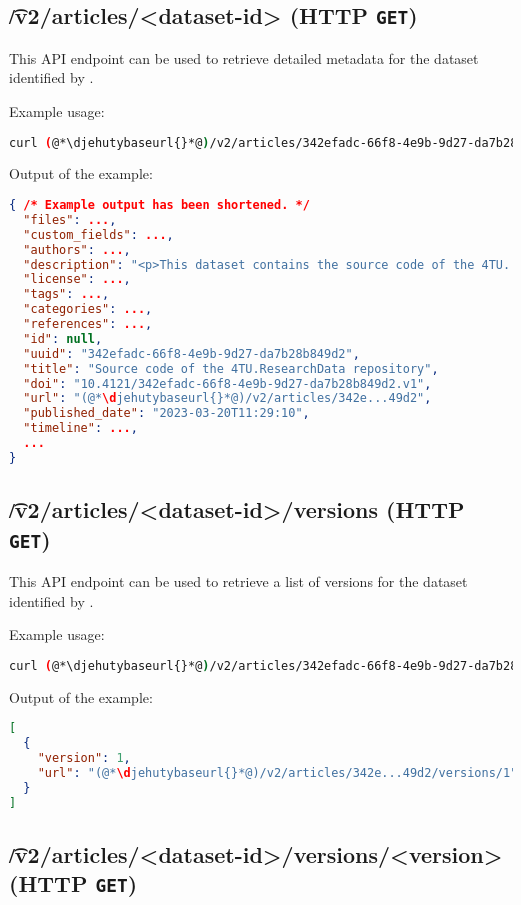 \subsection{\t{/v2/articles/<dataset-id>} (HTTP \texttt{GET})}
\label{sec:v2-articles-dataset-id}

  This API endpoint can be used to retrieve detailed metadata for the dataset
  identified by .

  Example usage:
\begin{lstlisting}[language=bash]
curl (@*\djehutybaseurl{}*@)/v2/articles/342efadc-66f8-4e9b-9d27-da7b28b849d2 | jq
\end{lstlisting}

  Output of the example:
\begin{lstlisting}[language=JSON]
{ /* Example output has been shortened. */
  "files": ...,
  "custom_fields": ...,
  "authors": ...,
  "description": "<p>This dataset contains the source code of the 4TU...",
  "license": ...,
  "tags": ...,
  "categories": ...,
  "references": ...,
  "id": null,
  "uuid": "342efadc-66f8-4e9b-9d27-da7b28b849d2",
  "title": "Source code of the 4TU.ResearchData repository",
  "doi": "10.4121/342efadc-66f8-4e9b-9d27-da7b28b849d2.v1",
  "url": "(@*\djehutybaseurl{}*@)/v2/articles/342e...49d2",
  "published_date": "2023-03-20T11:29:10",
  "timeline": ...,
  ...
}
\end{lstlisting}

\subsection{\t{/v2/articles/<dataset-id>/versions} (HTTP \texttt{GET})}

  This API endpoint can be used to retrieve a list of versions for the dataset
  identified by .

  Example usage:
\begin{lstlisting}[language=bash]
curl (@*\djehutybaseurl{}*@)/v2/articles/342efadc-66f8-4e9b-9d27-da7b28b849d2/versions | jq
\end{lstlisting}

  Output of the example:
\begin{lstlisting}[language=JSON]
[
  {
    "version": 1,
    "url": "(@*\djehutybaseurl{}*@)/v2/articles/342e...49d2/versions/1"
  }
]
\end{lstlisting}

\subsection{\t{/v2/articles/<dataset-id>/versions/<version>} (HTTP \texttt{GET})}

